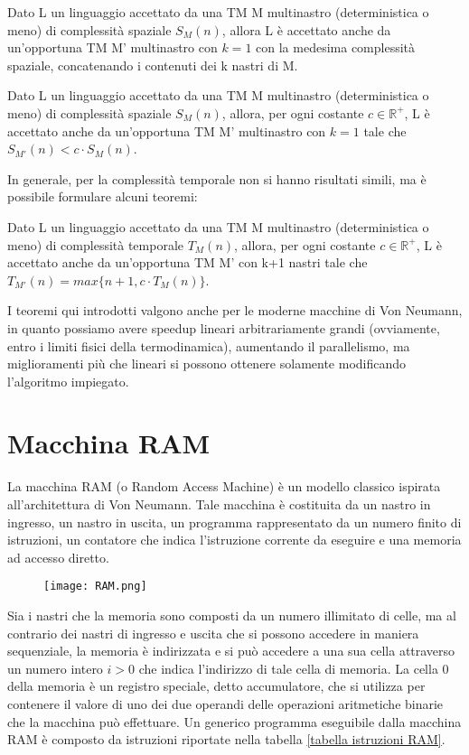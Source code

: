   \begin{theorem}
    Dato L un linguaggio accettato da una TM M multinastro (deterministica o meno) di complessità spaziale \({S}_M(n)\), allora L è accettato anche da un'opportuna TM M' multinastro con \(k=1\) con la medesima complessità spaziale, concatenando i contenuti dei k nastri di M.
  \end{theorem}

  \begin{theorem}
    Dato L un linguaggio accettato da una TM M multinastro (deterministica o meno) di complessità spaziale \({S}_M(n)\), allora, per ogni costante \(c\in \mathbb{R}^+\), L è accettato anche da un'opportuna TM M' multinastro con \(k=1\) tale che \({S}_{M'}(n)<c\cdot{S}_M(n)\).
  \end{theorem}

  In generale, per la complessità temporale non si hanno risultati simili, ma è possibile formulare alcuni teoremi:

  \begin{theorem}
    Dato L un linguaggio accettato da una TM M multinastro (deterministica o meno) di complessità temporale \({T}_M(n)\), allora, per ogni costante \(c\in \mathbb{R}^+\), L è accettato anche da un'opportuna TM M' con k+1 nastri tale che \({T}_{M'}(n) = max\{n+1, c\cdot{T}_M(n)\}\).    
  \end{theorem}

  I teoremi qui introdotti valgono anche per le moderne macchine di Von Neumann, in quanto possiamo avere speedup lineari arbitrariamente grandi (ovviamente, entro i limiti fisici della termodinamica), aumentando il parallelismo, ma miglioramenti più che lineari si possono ottenere solamente modificando l'algoritmo impiegato. 

  \section{Macchina RAM}
  La macchina RAM (o Random Access Machine) è un modello classico ispirata all'architettura di Von Neumann. Tale macchina è costituita da un nastro in ingresso, un nastro in uscita, un programma rappresentato da un numero finito di istruzioni, un contatore che indica l'istruzione corrente da eseguire e una memoria ad accesso diretto.

  \begin{figure}[h]
    \texttt{[image: RAM.png]}
  \end{figure}

  Sia i nastri che la memoria sono composti da un numero illimitato di celle, ma al contrario dei nastri di ingresso e uscita che si possono accedere in maniera sequenziale, la memoria è indirizzata e si può accedere a una sua cella attraverso un numero intero \(i>0\) che indica l'indirizzo di tale cella di memoria. La cella 0 della memoria è un registro speciale, detto accumulatore, che si utilizza per contenere il valore di uno dei due operandi delle operazioni aritmetiche binarie che la macchina può effettuare. Un generico programma eseguibile dalla macchina RAM è composto da istruzioni riportate nella tabella \ref{tabella istruzioni RAM}.

